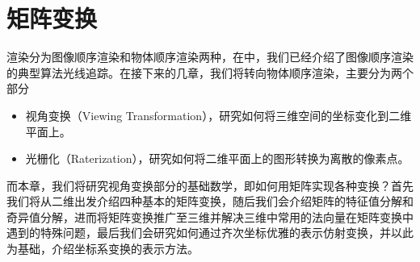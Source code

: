 \chapter{矩阵变换}
渲染分为图像顺序渲染和物体顺序渲染两种，在中，我们已经介绍了图像顺序渲染的典型算法光线追踪。在接下来的几章，我们将转向物体顺序渲染，主要分为两个部分
\begin{itemize}
    \item 视角变换（Viewing Transformation），研究如何将三维空间的坐标变化到二维平面上。
    \item 光栅化（Raterization），研究如何将二维平面上的图形转换为离散的像素点。
\end{itemize}
而本章，我们将研究视角变换部分的基础数学，即如何用矩阵实现各种变换？首先我们将从二维出发介绍四种基本的矩阵变换，随后我们会介绍矩阵的特征值分解和奇异值分解，进而将矩阵变换推广至三维并解决三维中常用的法向量在矩阵变换中遇到的特殊问题，最后我们会研究如何通过齐次坐标优雅的表示仿射变换，并以此为基础，介绍坐标系变换的表示方法。


